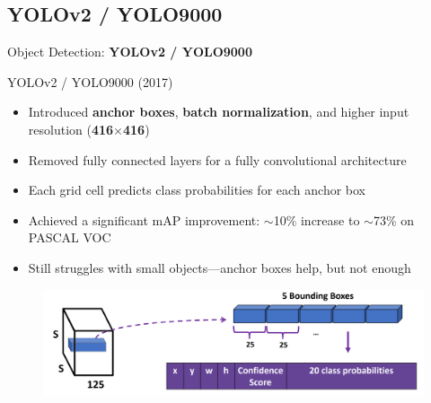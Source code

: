 \subsection{YOLOv2 / YOLO9000}
\begin{frame}{}
    \LARGE Object Detection: \textbf{YOLOv2 / YOLO9000}
\end{frame}

\begin{frame}{YOLOv2 / YOLO9000 (2017)}
    \begin{itemize}
        \setlength{\itemsep}{-0.5em}
        \item Introduced \textbf{anchor boxes}, \textbf{batch normalization}, and higher input resolution (\textbf{416$\times$416})
        \item Removed fully connected layers for a fully convolutional architecture
        \item Each grid cell predicts class probabilities for each anchor box
        \item Achieved a significant mAP improvement: $\sim$10\% increase to $\sim$73\% on PASCAL VOC
        \item Still struggles with small objects—anchor boxes help, but not enough
    \end{itemize}

    \begin{figure}
        \centering
        \includegraphics[width=1.0\textwidth,height=1.0\textheight,keepaspectratio]{images/object-detect/yolo_17.png}
    \end{figure}    
\end{frame}